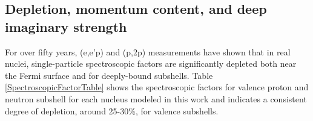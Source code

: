 \subsection{Depletion, momentum content, and deep imaginary strength}
For over fifty years, (e,e'p) and (p,2p) measurements have shown that in real
nuclei, single-particle spectroscopic factors are significantly depleted both
near the Fermi surface and for deeply-bound subshells. Table
\ref{SpectroscopicFactorTable} shows
the spectroscopic factors for valence proton and neutron subshell
for each nucleus modeled in this work and indicates a consistent degree of depletion, around
25-30\%, for valence subshells.
\begin{table}[H]
    \centering
    {
    }
    \caption[Valence Spectroscopic Factors extracted from DOM analysis]
    {
        Spectroscopic factors for protons and neutrons in the valence
        subshell (e.g., $\pi$\pOne, $\nu$\dFive for \oEight) are listed for
        all nuclei considered in the present treatment.
    }
    \label{SpectroscopicFactorTable}
\end{table}

